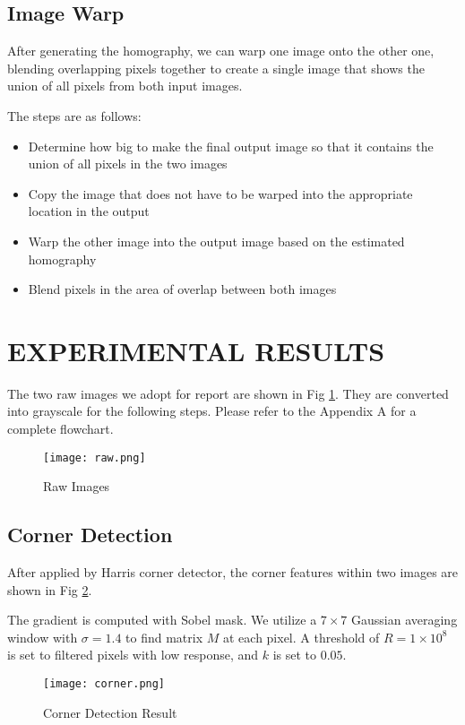 \documentclass[letterpaper, 10 pt, conference]{ieeeconf}
\begin{document}
\subsection{Image Warp}
After generating the homography, we can warp one image onto the other one, blending overlapping pixels together to create a single image that shows the union of all pixels from both input images. 

The steps are as follows:
\begin{itemize}
    \item Determine how big to make the final output image so that it contains the union of all pixels in the two images
    \item Copy the image that does not have to be warped into the appropriate location in the output
    \item Warp the other image into the output image based on the estimated homography
    \item Blend pixels in the area of overlap between both images
\end{itemize}
\section{EXPERIMENTAL RESULTS}
The two raw images we adopt for report are shown in Fig \ref{raw}. They are converted into grayscale for the following steps. Please refer to the Appendix A for a complete flowchart.
\begin{figure}[thpb]
\centering
\texttt{[image: raw.png]}
\caption{Raw Images}
\label{raw}
\end{figure}
\subsection{Corner Detection}
After applied by Harris corner detector, the corner features within two images are shown in Fig \ref{corner}.

The gradient is computed with Sobel mask. We utilize a $7\times7$ Gaussian averaging window with $\sigma=1.4$ to find matrix $M$ at each pixel. A threshold of $R = 1\times 10^8$ is set to filtered pixels with low response, and $k$ is set to $0.05$.

\begin{figure}[thpb]
\centering
\texttt{[image: corner.png]}
\caption{Corner Detection Result}
\label{corner}
\end{figure}
\end{document}
